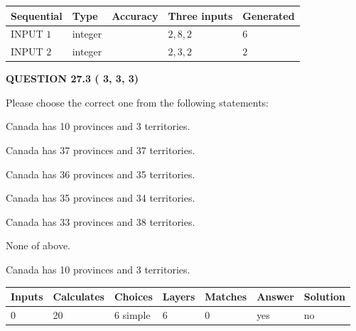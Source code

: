 \documentclass[12pt]{article}
\begin{document}
   
  
  
\noindent\begin{tabular}{|l|l|l|l|l|}
\hline
 Sequential & Type & Accuracy & Three inputs & Generated \\ 
\hline
 
 
  INPUT $           1$ & integer &  & $
 2
 , 
 8
 , 
 2
 $ & $ 6 $ 
 \\  \hline  
 
 
  INPUT $           2$ & integer &  & $
 2
 , 
 3
 , 
 2
 $ & $ 2 $ 
 \\  \hline  
 \end{tabular}
   
   
  
\vspace{0.2in}
  
{\textbf{\Large{QUESTION
27.3 
 (          3,          3,          3)
}}}
  
  
Please choose the correct one from the following statements:
 
 
Canada has  %
10 provinces and  %
3 territories.
 
 
Canada has  %
37 provinces and  %
37 territories.
 
 
Canada has  %
36 provinces and  %
35 territories.
 
 
Canada has  %
35 provinces and  %
34 territories.
 
 
Canada has  %
33 provinces and  %
38 territories.
 
 
 None of above.
 
 
\noindent{}
 
 
Canada has  %
10 provinces and  %
3 territories.
 
 
\noindent{}
 
 
   
   
   
   
\noindent\begin{tabular}{|l|l|l|l|l|l|l|}
 \hline
Inputs & Calculates & Choices & Layers & Matches & Answer & Solution \\ \hline
           0 & 
          20 & 
           6
  simple  
  & 
           6 & 
           0 & 
  yes & 
  no 
  \\ \hline
 \end{tabular}
   
\end{document}
